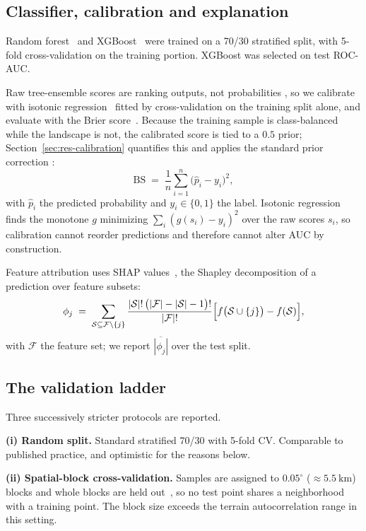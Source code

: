 \documentclass[10pt,twocolumn]{article}
\begin{document}
\subsection{Classifier, calibration and explanation}
Random forest~\citep{breiman2001} and XGBoost~\citep{chen2016} were trained on a
70/30 stratified split, with 5-fold cross-validation on the training portion.
XGBoost was selected on test ROC-AUC.

Raw tree-ensemble scores are ranking outputs, not probabilities
\citep{niculescu2005}, so we calibrate with isotonic
regression~\citep{zadrozny2002} fitted by cross-validation on the training split
alone, and evaluate with the Brier score~\citep{brier1950}. Because the training
sample is class-balanced while the landscape is not, the calibrated score is
tied to a $0.5$ prior; Section~\ref{sec:res-calibration} quantifies this and
applies the standard prior correction \citep{elkan2001,saerens2002}:
\begin{equation}
\mathrm{BS} \;=\; \frac{1}{n}\sum_{i=1}^{n}\bigl(\hat{p}_i - y_i\bigr)^2,
\label{eq:brier}
\end{equation}
with $\hat{p}_i$ the predicted probability and $y_i\in\{0,1\}$ the label. Isotonic
regression finds the monotone $g$ minimizing $\sum_i (g(s_i)-y_i)^2$ over the
raw scores $s_i$, so calibration cannot reorder predictions and therefore cannot
alter AUC by construction.

Feature attribution uses SHAP values~\citep{lundberg2017}, the Shapley
decomposition of a prediction over feature subsets:
\begin{equation}
\phi_j \;=\; \sum_{\mathcal{S}\subseteq \mathcal{F}\setminus\{j\}}
\frac{|\mathcal{S}|!\,\bigl(|\mathcal{F}|-|\mathcal{S}|-1\bigr)!}{|\mathcal{F}|!}
\Bigl[f\bigl(\mathcal{S}\cup\{j\}\bigr) - f(\mathcal{S})\Bigr],
\label{eq:shap}
\end{equation}
with $\mathcal{F}$ the feature set; we report $\overline{|\phi_j|}$ over the test
split.

\subsection{The validation ladder}
\label{sec:method-validation}
Three successively stricter protocols are reported.

\textbf{(i) Random split.} Standard stratified 70/30 with 5-fold CV. Comparable
to published practice, and optimistic for the reasons below.

\textbf{(ii) Spatial-block cross-validation.} Samples are assigned to
$0.05^\circ$ ($\approx\SI{5.5}{\kilo\metre}$) blocks and whole blocks are held
out~\citep{roberts2017}, so no test point shares a neighborhood with a training
point. The block size exceeds the terrain autocorrelation range in this setting.
\end{document}
